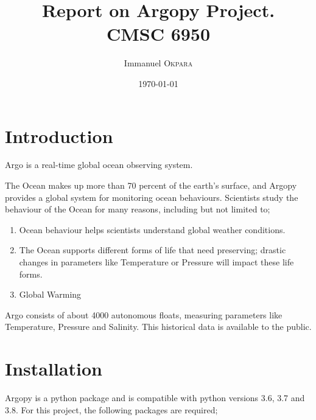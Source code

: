 \documentclass{article}
\title{Report on Argopy Project. \\ CMSC 6950} %
\author{Immanuel \textsc{Okpara}} %
\date{\today} %
\begin{document}
\maketitle %



\section{Introduction}

Argo is a real-time global ocean observing system.

The Ocean makes up more than 70 percent of the earth's surface, and Argopy provides a global system for monitoring ocean behaviours.
Scientists study the behaviour of the Ocean for many reasons, including but not limited to;
\begin{enumerate}
    \item Ocean behaviour helps scientists understand global weather conditions.
    \item The Ocean supports different forms of life that need preserving; drastic changes in parameters like Temperature or Pressure will impact these life forms. 
    \item Global Warming
    \end{enumerate}
Argo consists of about 4000 autonomous floats, measuring parameters like Temperature, Pressure and Salinity. This historical data is available to the public.\\


\section{Installation}
Argopy is a python package and is compatible with python versions 3.6, 3.7 and 3.8. 
For this project, the following packages are required;
\end{document}

